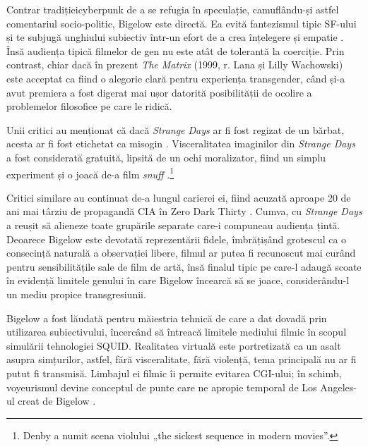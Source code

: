 \documentclass[12pt]{article}
\begin{document}
	Contrar \dedouble tradiției\sqtworight\:cyberpunk de a se refugia în speculație, camuflându-și astfel comentariul socio-politic, Bigelow este directă. Ea evită fantezismul tipic SF-ului și te subjugă unghiului subiectiv într-un efort de a crea înțelegere și empatie \cite{Ebert1995a}. Însă audiența tipică filmelor de gen nu este atât de tolerantă la coerciție. Prin contrast, chiar dacă în prezent \textit{The Matrix} (1999, r. Lana și Lilly Wachowski) este acceptat ca fiind o alegorie clară pentru experiența transgender, când și-a avut premiera a fost digerat mai ușor datorită posibilității de ocolire a problemelor filosofice pe care le ridică.\par 
	
	Unii critici au menționat că dacă \textit{Strange Days} ar fi fost regizat de un bărbat, acesta ar fi fost etichetat ca misogin \cite{MirasolBigelowUncanny2010}. Visceralitatea imaginilor din \textit{Strange Days} a fost considerată gratuită, lipsită de un ochi moralizator, fiind un simplu experiment și o joacă de-a film \textit{snuff} \cite{Guthmann1995a,DenbyPeopleStrange1995}.\footnote{Denby a numit scena violului „the sickest sequence in modern movies”.}\par
	
	Critici similare au continuat de-a lungul carierei ei, fiind acuzată aproape 20 de ani mai târziu de propagandă CIA în Zero Dark Thirty \cite{Vishnevetsky2012a}. Cumva, cu \textit{Strange Days} a reușit să alieneze toate grupările separate care-i compuneau audiența țintă. Deoarece Bigelow este devotată reprezentării fidele, îmbrățișând grotescul ca o consecință naturală a observației libere, filmul ar putea fi recunoscut mai curând pentru sensibilitățile sale de film de artă, însă finalul tipic pe care-l adaugă scoate în evidență limitele genului în care Bigelow încearcă să se joace, considerându-l un mediu propice transgresiunii.\par
	
	Bigelow a fost lăudată pentru măiestria tehnică de care a dat dovadă prin utilizarea subiectivului, încercând să întreacă limitele mediului filmic în scopul simulării tehnologiei \dedouble SQUID\sqtworight. Realitatea virtuală este portretizată ca un asalt asupra simțurilor, astfel, fără visceralitate, fără violență, tema principală nu ar fi putut fi transmisă. Limbajul ei filmic îi permite evitarea CGI-ului; în schimb, voyeurismul devine conceptul de punte care ne apropie temporal de Los Angeles-ul creat de Bigelow \cite{Hultkrans2010a}.\par
	
\end{document}
